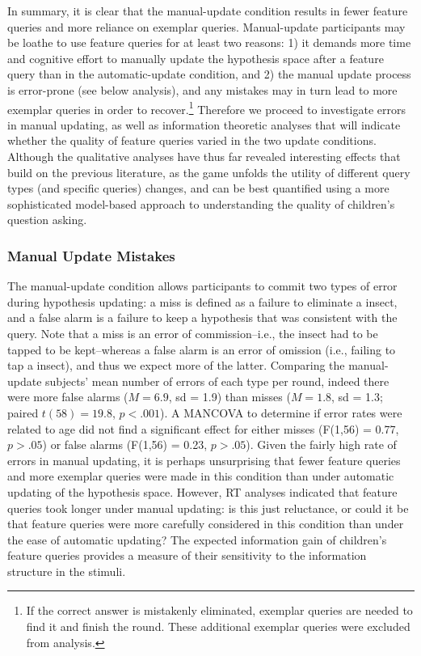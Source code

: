 \documentclass[man,floatsintext]{apa6}
\begin{document}
 In summary, it is clear that the manual-update condition results in fewer feature 
queries and more reliance on exemplar queries. 
Manual-update participants may be loathe to use feature queries for at least two reasons: 1) it demands more time and cognitive effort to manually update the hypothesis space after a feature query than 
in the automatic-update condition, and 2) the manual update process is error-prone (see below analysis), 
and any mistakes may in turn lead to more exemplar queries in order to recover.\footnote{If the correct answer is mistakenly eliminated, exemplar queries are needed to find it and finish the round. These additional exemplar queries were excluded from analysis.} Therefore we proceed to investigate errors in manual updating, as well as information theoretic analyses that will indicate whether the quality of feature queries varied in the two update conditions. Although the qualitative analyses have thus far revealed interesting effects that build on the previous literature, as the game unfolds the utility of different query types (and specific queries) changes, and can be best quantified using a more sophisticated model-based approach to understanding the quality of children's question asking.

\subsubsection{Manual Update Mistakes}

The manual-update condition allows participants to commit two types of error during 
hypothesis updating: a miss is defined as a failure to eliminate a insect, and a false 
alarm is a failure to keep a hypothesis that was consistent with the query. Note that 
a miss is an error of commission--i.e., the insect had to be tapped to be kept--whereas 
a false alarm is an error of omission (i.e., failing to tap a insect), and thus we expect 
more of the latter. Comparing the manual-update subjects' mean number of errors of 
each type per round, indeed there were more false alarms ($M=6.9$, sd = 1.9) than 
misses ($M=1.8$, sd = 1.3; paired $t(58) = 19.8$, $p<.001$). A MANCOVA to 
determine if error rates were related to age did not find a significant effect for either 
misses (F(1,56) = 0.77, $p>.05$) or false alarms (F(1,56) = 0.23, $p>.05$). Given 
the fairly high rate of errors in manual updating, it is perhaps unsurprising that fewer 
feature queries and more exemplar queries were made in this condition than under 
automatic updating of the hypothesis space. However, RT analyses indicated that 
feature queries took longer under manual updating: is this just reluctance, or could it 
be that feature queries were more carefully considered in this condition than under 
the ease of automatic updating? The expected information gain of children's feature queries provides a measure of their sensitivity to the information structure in the stimuli.
\end{document}
